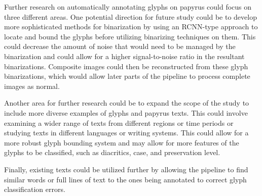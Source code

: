 Further research on automatically annotating glyphs on papyrus could focus on three different areas. One potential direction for future study could be to develop more sophisticated methods for binarization by using an RCNN-type approach to locate and bound the glyphs before utilizing binarizing techniques on them. This could decrease the amount of noise that would need to be managed by the binarization and could allow for a higher signal-to-noise ratio in the resultant binarizations. Composite images could then be reconstructed from these glyph binarizations, which would allow later parts of the pipeline to process complete images as normal.

Another area for further research could be to expand the scope of the study to include more diverse examples of glyphs and papyrus texts. This could involve examining a wider range of texts from different regions or time periods or studying texts in different languages or writing systems. This could allow for a more robust glyph bounding system and may allow for more features of the glyphs to be classified, such as diacritics, case, and preservation level.

Finally, existing texts could be utilized further by allowing the pipeline to find similar words or full lines of text to the ones being annotated to correct glyph classification errors.
